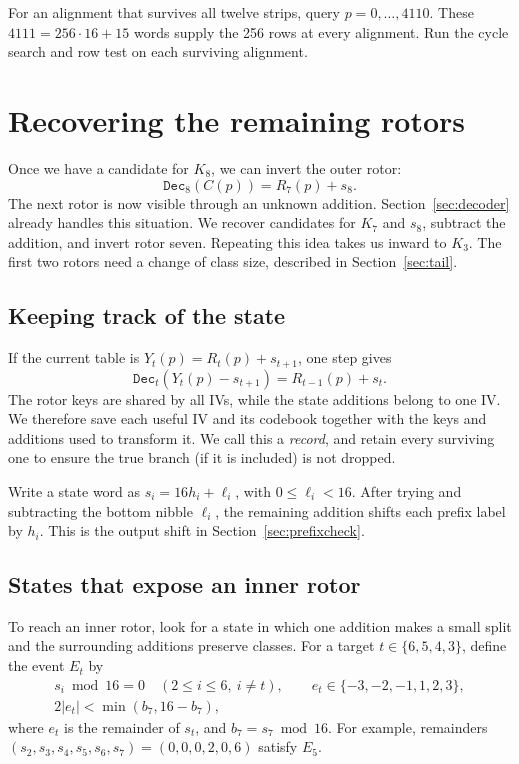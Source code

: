 \documentclass[11pt]{article}
\begin{document}
For an alignment that survives all twelve strips, query
\(p=0,\ldots,4110\). These \(4111=256\cdot16+15\) words supply the
256 rows at every alignment. Run the cycle search and row test on each
surviving alignment.

\section{Recovering the remaining rotors}\label{sec:inward}
Once we have a candidate for \(K_8\), we can invert the outer rotor:
\[
 \mathtt{Dec}_8(C(p))=R_7(p)+s_8.
\]
The next rotor is now visible through an unknown addition. Section~\ref{sec:decoder}
already handles this situation. We recover candidates for \(K_7\) and
\(s_8\), subtract the addition, and invert rotor seven. Repeating this
idea takes us inward to \(K_3\). The first two rotors need a change of
class size, described in Section~\ref{sec:tail}.

\subsection{Keeping track of the state}
If the current table is \(Y_t(p)=R_t(p)+s_{t+1}\), one step gives
\begin{equation}
 \mathtt{Dec}_t(Y_t(p)-s_{t+1})=R_{t-1}(p)+s_t.
 \label{eq:pivot}
\end{equation}
The rotor keys are shared by all IVs, while the state additions belong
to one IV. We therefore save each useful IV and its codebook together
with the keys and additions used to transform it. We call this a
\emph{record}, and retain every surviving one to ensure the true branch (if it is included) is not dropped.

Write a state word as \(s_i=16h_i+\ell_i\), with \(0\le\ell_i<16\).
After trying and subtracting the bottom nibble \(\ell_i\), the remaining
addition shifts each prefix label by \(h_i\). This is the output shift
in Section~\ref{sec:prefixcheck}.

\subsection{States that expose an inner rotor}
To reach an inner rotor, look for a state in which one addition makes
a small split and the surrounding additions preserve classes.
For a target \(t\in\{6,5,4,3\}\), define the event \(E_t\) by
\begin{equation}
 \begin{gathered}
 s_i\bmod16=0\quad(2\le i\le6,\ i\ne t),\qquad
 e_t\in\{-3,-2,-1,1,2,3\},\\
 2|e_t|<\min(b_7,16-b_7),
 \end{gathered}
 \label{eq:inner}
\end{equation}
where \(e_t\) is the remainder of \(s_t\), and
\(b_7=s_7\bmod16\). For example, remainders
\((s_2,s_3,s_4,s_5,s_6,s_7)=(0,0,0,2,0,6)\) satisfy \(E_5\).
\end{document}
